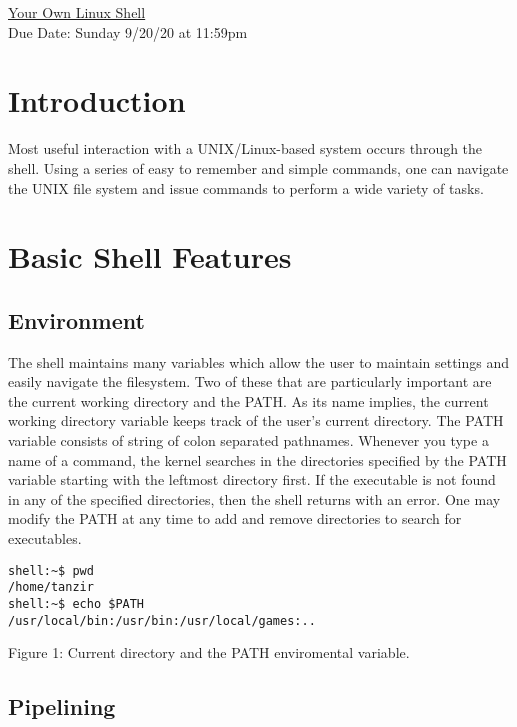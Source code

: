 \documentclass[12pt]{article}
\newcommand{\duedate}{Sunday 9/20/20 at 11:59pm}
\begin{document}
\begin{center}
    \underline{\huge Your Own Linux Shell}\\
    {Due Date: \duedate}
\end{center}


\section*{Introduction}
Most useful interaction with a UNIX/Linux-based system occurs through the shell.  Using a series of easy to remember and simple commands, one can navigate the UNIX file system and issue commands to perform a wide variety of tasks.

\section*{Basic Shell Features}

\subsection*{Environment}

The shell maintains many variables which allow the user to maintain settings and easily navigate the filesystem.  Two of these that are particularly important are the current working directory and the PATH.  As its name implies, the current working directory variable keeps track of the user's current directory.  The PATH variable consists of string of colon separated pathnames.  Whenever you type a name of a command, the kernel searches in the directories specified by the PATH variable starting with the leftmost directory first.  If the executable is not found in any of the specified directories, then the shell returns with an error.  One may modify the PATH at any time to add and remove directories to search for executables.

\begin{center}
\begin{lstlisting}[style=bash]
shell:~$ pwd 
/home/tanzir 
shell:~$ echo $PATH
/usr/local/bin:/usr/bin:/usr/local/games:..
\end{lstlisting}
Figure 1: Current directory and the PATH enviromental variable.
\end{center}


\subsection*{Pipelining}
\end{document}
